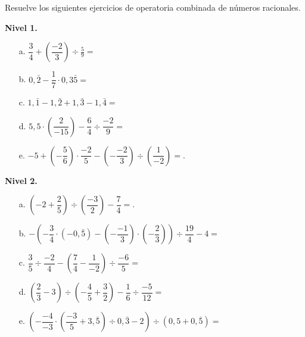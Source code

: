 \documentclass[spanish,letterpaper, 11pt, addpoints, answers]{exam}
\begin{document}
\begin{questions}
\begin{itemize}
\end{itemize}

\question Resuelve los siguientes ejercicios de operatoria combinada de números racionales.

\textbf{Nivel 1.}
\begin{itemize}
\item[a.] $\dfrac{3}{4}+\left(\dfrac{-2}{3}\right)\div \frac{5}{9}=$

\item[b.] $0{,}\bar{2}-\dfrac{1}{7}\cdot 0{,}3\bar{5}=$

\item[c.] $1{,}\bar{1}-1{,}\bar{2}+1{,}\bar{3}-1{,}\bar{4}=$

\item[d.] $5{,}5\cdot \left(\dfrac{2}{-15}\right)-\dfrac{6}{4}\div \dfrac{-2}{9}=$

\item[e.] $-5+\left(-\dfrac{5}{6}\right)\cdot \dfrac{-2}{5}-\left(-\dfrac{-2}{3}\right)\div \left(\dfrac{1}{-2}\right)=$.

\end{itemize}

\textbf{Nivel 2.}
\begin{itemize}
\item[a.] $\left(-2+\dfrac{2}{5}\right)\div \left(\dfrac{-3}{2}\right)-\dfrac{7}{4}=$.

\item[b.] $-\left(-\dfrac{3}{4}\cdot \left(-0{,}\bar{5}\right)-\left(-\dfrac{-1}{3}\right)\cdot\left(-\dfrac{2}{3}\right)\right)\div \dfrac{19}{4}-4=$

\item[c.] $\dfrac{3}{5}\div \dfrac{-2}{4}-\left(\dfrac{7}{4}-\dfrac{1}{-2}\right)\div \dfrac{-6}{5}=$

\item[d.] $\left(\dfrac{2}{3}-3\right)\div\left(-\dfrac{4}{5}+\dfrac{3}{2}\right)-\dfrac{1}{6}\div \dfrac{-5}{12}=$ 

\item[e.] $\left(-\dfrac{-4}{-3}\cdot \left(\dfrac{-3}{5}+3{,}\bar{5}\right)\div 0{,}\bar{3}-2\right)\div \left(0{,}5+0{,}\bar{5}\right)=$ 

\end{itemize}


\end{questions}
\end{document}
